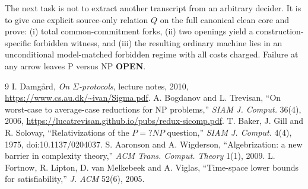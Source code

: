 \documentclass[11pt]{article}
\newcommand{\OPEN}{\textbf{OPEN}}
\begin{document}
The next task is not to extract another transcript from an arbitrary decider.
It is to give one explicit source-only relation $Q$ on the full canonical
clean core and prove: (i) total common-commitment forks, (ii) two openings
yield a construction-specific forbidden witness, and (iii) the resulting
ordinary machine lies in an unconditional model-matched forbidden regime
with all costs charged.  Failure at any arrow leaves P versus NP \OPEN.

\begin{thebibliography}{9}
 I. Damg\aa rd, \emph{On $\Sigma$-protocols}, lecture
notes, 2010, \url{https://www.cs.au.dk/~ivan/Sigma.pdf}.
 A. Bogdanov and L. Trevisan, ``On worst-case to average-case
reductions for NP problems,'' \emph{SIAM J. Comput.} 36(4), 2006,
\url{https://lucatrevisan.github.io/pubs/redux-sicomp.pdf}.
 T. Baker, J. Gill and R. Solovay, ``Relativizations of the
$P=?NP$ question,'' \emph{SIAM J. Comput.} 4(4), 1975,
doi:10.1137/0204037.
 S. Aaronson and A. Wigderson, ``Algebrization: a new barrier
in complexity theory,'' \emph{ACM Trans. Comput. Theory} 1(1), 2009.
 L. Fortnow, R. Lipton, D. van Melkebeek and A. Viglas,
``Time-space lower bounds for satisfiability,'' \emph{J. ACM} 52(6), 2005.
\end{thebibliography}

\end{document}
